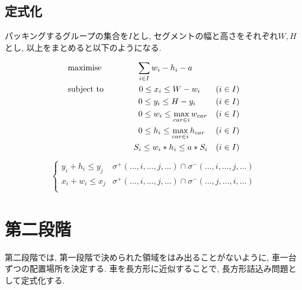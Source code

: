 \subsection{定式化}
パッキングするグループの集合を$I$とし, セグメントの幅と高さをそれぞれ$W, H$とし, 以上をまとめると以下のようになる. \\
\begin{center}
    \begin{align}
        & \textrm{maximise} \hspace{1.5cm}
        \sum_{i \in I} w_i - h_i - a \\
        & \textrm{subject\ to} \hspace{1.5cm}
        0 \leq x_i \leq W - w_i & (i \in I) \\
        &\hspace{3cm} 0 \leq y_i \leq H - y_i & (i \in I) \\
        &\hspace{3cm} 0 \leq w_i \leq \max_{car \in i}w_{car} & (i \in I) \\
        &\hspace{3cm} 0 \leq h_i \leq \max_{car \in i}h_{car} & (i \in I) \\
        &\hspace{2.8cm} S_i \leq w_i*h_i \leq a*S_i &(i \in I)
    \end{align}
    \begin{eqnarray}
        \hspace{2cm} \left\{
            \begin{array}{ll}
                y_i + h_i \leq y_j & \sigma^+(\ldots,i,\ldots,j,\ldots) \cap \sigma^-(\ldots,i,\ldots,j,\ldots) \\
                x_i + w_i \leq x_j & \sigma^+(\ldots,i,\ldots,j,\ldots) \cap \sigma^-(\ldots,j,\ldots,i,\ldots) \\
            \end{array}
        \hspace{2cm} \right.
    \end{eqnarray}
\end{center}

\section{第二段階}
第二段階では, 第一段階で決められた領域をはみ出ることがないように, 車一台ずつの配置場所を決定する. 
車を長方形に近似することで, 長方形詰込み問題として定式化する. 

